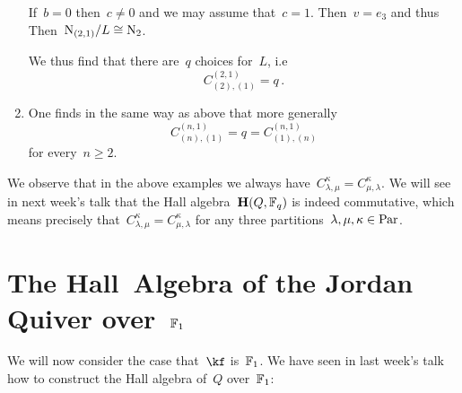 \documentclass[a4paper,11pt]{scrartcl}
\begin{document}
\begin{example}
\begin{enumerate}
      If~$b = 0$ then~$c \neq 0$ and we may assume that~$c = 1$.
      Then~$v = e_3$ and thus
      Then~$\mathrm{N}_{(2,1)}/L \cong \mathrm{N}_2$.

      We thus find that there are~$q$ choices for~$L$, i.e
      \[
        C^{(2,1)}_{(2),(1)}
        =
        q \,.
      \]
    \item
      One finds in the same way as above that more generally
      \[
        C^{(n, 1)}_{(n), (1)}
        =
        q
        =
        C^{(n, 1)}_{(1), (n)}
      \]
      for every~$n \geq 2$.
  \end{enumerate}
  We observe that in the above examples we always have~$C^{\kappa}_{\lambda, \mu} = C^{\kappa}_{\mu, \lambda}$.
  We will see in next week’s talk that the Hall algebra~$\mathbf{H}(Q, \mathbb{F}_q)$ is indeed commutative, which means precisely that~$C^\kappa_{\lambda, \mu} = C^\kappa_{\mu, \lambda}$ for any three partitions~$\lambda, \mu, \kappa \in \mathrm{Par}$.
\end{example}





\section{The Hall~Algebra of the Jordan Quiver over~$\mathbb{F}_1$}

We will now consider the case that~$\kf$ is~$\mathbb{F}_1$.
We have seen in last week’s talk how to construct the Hall algebra of~$Q$ over~$\mathbb{F}_1$:
\end{document}
